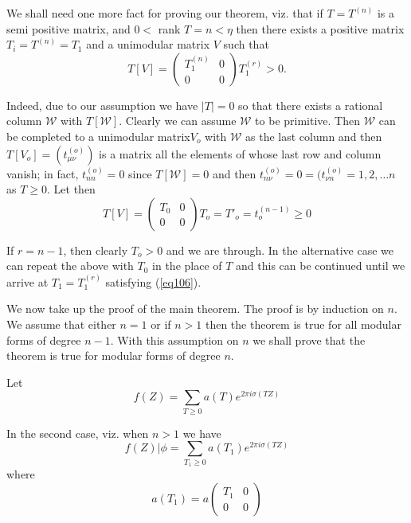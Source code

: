 We shall need one more fact for proving our theorem, viz. that if $T
= T^{(n)}$ is a semi positive matrix, and $0 < $ rank $ T = n < \eta$
then there exists a positive matrix $T_i = T^{(n)} = T_1$ and a
unimodular matrix $V$ such that  
\begin{equation*}
T[V] =
\begin{pmatrix}
T_1^{(n)} & 0 \\
0 & 0
\end{pmatrix}
T_1^{(r)}> 0. \tag{106}\label{eq106}
\end{equation*}

Indeed, due to our assumption we have $|T| = 0$ so that there exists
a rational column $\mathcal{W}$ with $T[\mathcal{W}]$. Clearly we can
assume $\mathcal{W}$ to be primitive. Then $\mathcal{W}$ can be
completed to a unimodular matrix\pageoriginale $V_o$ with
$\mathcal{W}$ as the last 
column and then $T[V_o] =  ( t^{(o)}_{\mu \nu})$ is a matrix all the
elements of whose last row and column vanish; in fact, $t^{(o)}_{ n n
} = 0$ since $T[\mathcal{W}] = 0$ and then $t^{(o)}_{n \nu} = 0 =
(t^{(o)}_{\nu n} = 1, 2 , \ldots n $ as $T \geq 0$. Let then  
$$ 
T[V]=
\begin{pmatrix}
T_0  & 0 \\
0 & 0
\end{pmatrix}
T_o = T'_o = t_o^{(n - 1)} \geq 0
$$

If $r = n - 1$, then clearly $T_o > 0$ and we are through. In the
alternative case we can repeat the above with $T_0$ in the place of
$T$ and this can be continued until we arrive at $T_1 =T^{(r)}_1$
satisfying (\ref{eq106}). 

We now take up the proof of the  main theorem. The proof is by
induction on $n$. We assume that either $n = 1$ or if $n > 1$ then the
theorem is true for all modular forms of degree $n-1$. With this
assumption on $n$ we shall prove that the theorem is true for
modular forms of degree $n$. 

Let
\begin{equation*}
f (Z) = \sum_{T \geq 0} a (T)  e^{2 \pi i \sigma (TZ)} \tag{107}\label{eq107}
\end{equation*}

In the second case, viz. when $n > 1$ we have 
$$
f (Z)| \phi = \sum_{T_1\geq 0} a(T_1) e^{2 \pi i \sigma (TZ)} 
$$
where 
$$ 
a (T_1) = a  
\begin{pmatrix} 
T_1  & 0 \\
0 & 0
\end{pmatrix}
$$
 
